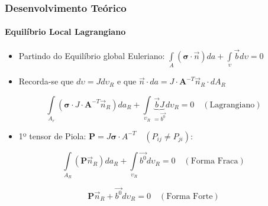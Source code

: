 \documentclass{beamer}
\begin{document}
\begin{frame}
    \frametitle{Desenvolvimento Teórico}
        \framesubtitle{Equilíbrio Local Lagrangiano}
        \begin{itemize}
            \item Partindo do Equilíbrio global Euleriano: \(\int\limits_{A} \left(\boldsymbol{\boldsymbol{\sigma}} \cdot \vec{n}\right) da  + \int\limits_{\upsilon} \vec{b}  d\upsilon = 0\)
        \end{itemize}

        \begin{itemize}
            \item Recorda-se que \(d\upsilon = J d\upsilon_R\) e que \(\vec{n}\cdot da = J \cdot \mathbf{A}^{-T} \vec{n}_R \cdot dA_R\)
        \end{itemize}

        \begin{equation}
            \int\limits_{A_r} \left(\boldsymbol{\sigma} \cdot J \cdot \mathbf{A}^{-T} \vec{n}_R\right) da_R  + \int\limits_{\upsilon_R} \underbrace{\vec{b} J}_{=\vec{b^0}} d\upsilon_R  = 0 \quad \left(\text{Lagrangiano}\right)
        \end{equation}

        \begin{itemize}
            \item 1º tensor de Piola: \(\mathbf{P}= J \mathbf{\boldsymbol{\sigma}}\cdot A^{-T} \quad \left(P_{ij} \neq P_{ji}\right)\):
        \end{itemize}

        \begin{equation}
            \int\limits_{A_R} \left(\mathbf{P} \vec{n}_R\right) da_R  + \int\limits_{\upsilon_R} \vec{b^0} d\upsilon_R  = 0 \quad \left(\text{Forma Fraca}\right)
        \end{equation}

        \begin{equation}
            \mathbf{P} \vec{n}_R + \vec{b^0} d\upsilon_R  = 0 \quad \left(\text{Forma Forte}\right)
        \end{equation}



\end{frame}
\end{document}
